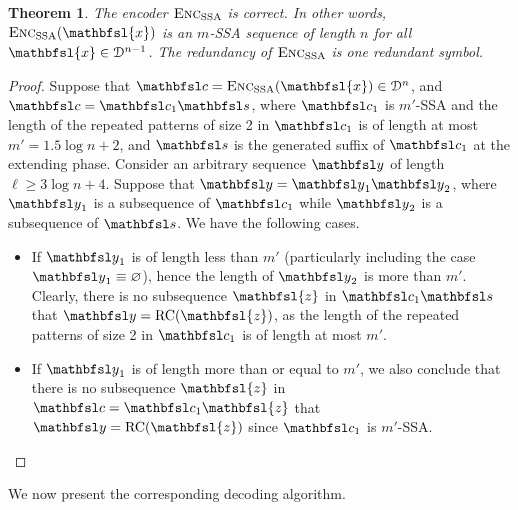 \documentclass[conference]{IEEEtran}
\theoremstyle{plain}
\newtheorem{theorem}{Theorem}
\theoremstyle{definition}
\newcommand{\D}{{\mathcal D}}
\newcommand{\bs}{{\mathbfsl s}}
\newcommand{\by}{{\mathbfsl y}}
\newcommand{\bc}{{\mathbfsl c}}
\newcommand{\bx}{{\mathbfsl{x}}}
\newcommand{\bz}{{\mathbfsl{z}}}
\renewcommand{\ge}{\geqslant}
\newcommand{\enc}{\textsc{Enc}}
\begin{document}
\begin{theorem}
The encoder $\enc_{{\rm SSA}}$ is correct. In other words, $\enc_{{\rm SSA}}(\bx)$ is an $m$-SSA sequence of length $n$ for all $\bx\in\D^{n-1}$. The redundancy of $\enc_{{\rm SSA}}$ is one redundant symbol. 
\end{theorem}
\begin{proof}
Suppose that $\bc=\enc_{{\rm SSA}}(\bx)\in \D^n$, and $\bc=\bc_1 \bs$, where $\bc_1$ is $m'$-SSA and the length of the repeated patterns of size 2 in $\bc_1$ is of length at most $m'=1.5\log n+2$, and $\bs$ is the generated suffix of $\bc_1$ at the extending phase. Consider an arbitrary sequence $\by$ of length $\ell \ge 3\log n+4$. Suppose that $\by=\by_1\by_2$, where $\by_1$ is a subsequence of $\bc_1$ while $\by_2$ is a subsequence of $\bs$. We have the following cases. 
\begin{itemize}
\item If $\by_1$ is of length less than $m'$ (particularly including the case $\by_1\equiv \varnothing$), hence the length of $\by_2$ is more than $m'$. Clearly, there is no subsequence $\bz$ in $\bc_1 \bs$ that $\by={\rm RC}(\bz)$, as the length of the repeated patterns of size 2 in $\bc_1$ is of length at most $m'$. 
\item If $\by_1$ is of length more than or equal to $m'$, we also conclude that there is no subsequence $\bz$ in $\bc=\bc_1 \bz$ that $\by={\rm RC}(\bz)$ since $\bc_1$ is $m'$-SSA. \qedhere
\end{itemize}
\end{proof}
We now present the corresponding decoding algorithm. 
\vspace{0.05in} 
\end{document}
